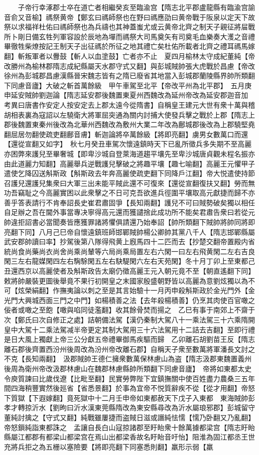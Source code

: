 　　子帝行幸涿郡士卒在道亡者相繼癸亥至臨渝宫【隋志北平郡盧龍縣有臨渝宫諭音俞又音榆】禡祭黄帝【鄭玄曰禡師祭也在野曰禡應劭曰黄帝戰于阪泉以定天下故祭以求福祥杜佑曰禡師祭也為兵禱也其神蓋蚩尤或云黄帝北齊之制天子親征將屇戰所卜剛日備玄牲列軍容設於辰地為墠而禡祭大司馬奠矢有司奠毛血樂奏大濩之音禮畢徹牲柴燎按記王制天子出征禡於所征之地其禮亡矣杜佑所載者北齊之禮耳禡馬嫁翻】斬叛軍者以釁鼓【斬人以血塗鼓】亡者亦不止　夏四月榆林太守成紀董純【帝改勝州為榆林郡隋志成紀縣屬天水郡守式又翻】與彭城賊帥張大虎戰於昌慮【帝改徐州為彭城郡昌慮漢縣晉宋魏志皆有之隋已廢省其地當入彭城郡蘭陵縣界帥所類翻下同慮音廬】大破之斬首萬餘級　甲午車駕至北平【帝改平州為北平郡】　五月庚申延安賊帥劉迦論【隋志延安郡後魏置東夏州西魏改為延州帝改為延安郡迦音加　考異曰唐書作安定人按安定去上郡太遠今從隋書】自稱皇王建元大世有衆十萬與稽胡相表裏為寇詔以左驍衛大將軍屈突通為關内討捕大使發兵擊之戰於上郡【隋志上郡後魏置東秦州後改為北華州西魏改為敷州大業二年改為鄜城郡後改為上郡驍堅堯翻屈居勿翻使疏吏翻鄜音膚】斬迦論將卒萬餘級【將即亮翻】虜男女數萬口而還【還從宣翻又如字】　秋七月癸丑車駕次懷遠鎮時天下已亂所徵兵多失期不至高麗亦困弊來護兒至畢奢城【即卑沙城自登萊海道趨平壤先至卑沙城唐貞觀未程名振亦由此道麗力知翻】高麗舉兵逆戰護兒擊破之將趣平壤【趣七喻翻】高麗王元懼甲子遣使乞降囚送斛斯政【斛斯政去年奔高麗使疏吏翻下同降戶江翻】帝大悦遣使持節召護兒還護兒集衆曰大軍三出未能平賊此還不可復來【還從宣翻復扶又翻】勞而無功吾竊耻之今高麗實困以此衆擊之不日可克吾欲進兵徑圍平壤取高元獻捷而歸不亦善乎答表請行不肯奉詔長史崔君肅固爭【長知兩翻】護兒不可曰賊勢破矣獨以相任自足辦之吾在閫外事當專决寧得高元還而獲譴捨此成功所不能矣君肅告衆曰若從元帥違拒詔書必當聞奏皆應獲罪諸將懼俱請還乃始奉詔【帥所類翻下賊帥將帥同將即亮翻下同】八月己巳帝自懷遠鎮班師邯鄲賊帥楊公卿帥其黨八千人【隋志邯鄲縣屬武安郡帥讀曰率】抄駕後第八隊得飛黄上廐馬四十二匹而去【抄楚交翻帝置殿内省統尚食尚藥尚衣尚舍尚乘尚輦等六局尚乘局置左右六閑一曰左右飛黄閑二左右吉良閑三左右龍媒閑四左右騊駼閑五左右駃騠閑六左右天苑閑】冬十月丁卯上至東都己丑還西京以高麗使者及斛斯政告太廟仍徵高麗王元入朝元竟不至【朝直遙翻下同】敕將帥嚴裝更圖後舉竟不果行初開皇之末國家殷盛朝野皆以高麗為意劉炫獨以為不可【炫榮絹翻】作撫夷論以刺之至是其言始驗十一月丙申殺斛斯政於金光門外【金光門大興城西面三門之中門】如楊積善之法【去年殺楊積善】仍烹其肉使百官噉之佞者或噉之至飽【噉與啗同徒濫翻】收其餘骨焚而揚之　乙巳有事于南郊上不齋于次【鄭氏曰次自修正之處】詰朝備法駕【漢仍秦制大駕八十一乘法駕三十六乘隋開皇中大駕十二乘法駕减半帝更定其制大駕用三十六法駕用十二詰去吉翻】至即行禮是日大風上獨獻上帝三公分獻五帝禮畢御馬疾驅而歸　乙卯離石胡劉苗王反【隋志離石郡後齊置西汾州後周改為汾州帝改離石郡】自稱天子衆至數萬將軍潘長文討之不克【長知兩翻】　汲郡賊帥王德仁擁衆數萬保林慮山為盗【隋志汲郡東魏置義州後周為衛州帝改汲郡林慮山在魏郡林慮縣帥所類翻下同慮音廬】　帝將如東都太史令庾質諫曰比歲伐遼【比毗至翻】民實勞弊陛下宜鎮撫關中使百姓盡力農桑三五年間四海稍豐實然後廵省【省悉景翻】於事為宜帝不悦質辭疾不從【從才用翻】帝怒下質獄【下遐嫁翻】竟死獄中十二月壬申帝如東都赦天下戊子入東都　東海賊帥彭孝才轉掠沂水【劉昫曰沂水漢東莞縣隋改為東安縣尋改為沂水屬琅邪郡】彭城留守董純討擒之【守式又翻】純戰雖屢捷而盗賊日滋或譖純怯懦【懦乃卧翻又乃亂翻】帝怒鎻純詣東都誅之　孟讓自長白山寇掠諸郡至盱眙衆十餘萬據都梁宫【隋志盱眙縣屬江都郡有都梁山都梁宫在焉山出都梁香故名盱眙音吁怡】阻淮為固江都丞王世充將兵拒之為五栅以塞險要【將即亮翻下同塞悉則翻】羸形示弱【羸